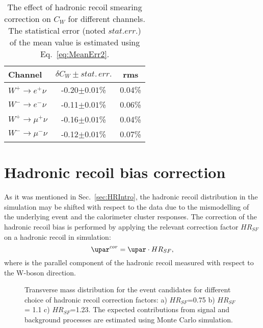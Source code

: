  \begin{table}[!t]
 \caption{The effect of hadronic recoil smearing correction on $C_{W}$ for different channels. The statistical error (noted $stat.err.$) of the mean value is estimated using Eq.~\ref{eq:MeanErr2}.}
\label{SmearCW}
\begin{center}
\begin{tabular}{| l  | c | c | }
\hline
Channel & $\delta C_W \pm stat.\, err.$ & rms \\
\hline
\hline
$W^{+} \to e^{+}\nu$ & -0.20$\pm0.01$\% & 0.04\% \\
$W^{-} \to e^{-}\nu$ & -0.11$\pm0.01$\% &  0.06\% \\
\hline
$W^{+} \to \mu^{+}\nu$ & -0.16$\pm0.01$\% & 0.04\% \\
$W^{-} \to \mu^{-}\nu$ & -0.12$\pm0.01$\% & 0.07\% \\
\hline
\end{tabular}
\end{center}

\end{table}

\section{Hadronic recoil bias correction}\label{sec:HRBias}


As it was mentioned in Sec.~\ref{sec:HRIntro}, the hadronic recoil distribution in the simulation may be shifted with respect to the data due to the mismodelling of the underlying event and the calorimeter cluster responses. The correction of the hadronic recoil bias is performed by applying the relevant correction factor $HR_{SF}$ on a hadronic recoil in simulation:
\begin{equation}
\upar^{cor}=\upar \cdot HR_{SF},
\end{equation}
where \upar is the parallel component of the hadronic recoil measured with respect to the W-boson direction.

\begin{figure}[!b]
\endminipage\hfill
{}
\endminipage\hfill
{}%
\endminipage
\caption{Transverse mass distribution for the \wenu event candidates for different  choice of hadronic recoil correction factors: a) $HR_{SF}$=0.75 b) $HR_{SF}$= 1.1 c) $HR_{SF}$=1.23. The expected contributions from signal and background processes are estimated using Monte Carlo simulation.}
\label{HadronRecoilScaleMtW}
\end{figure}

